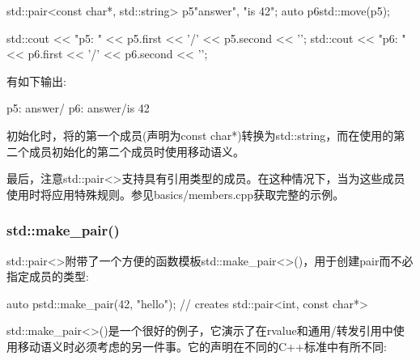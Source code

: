 \begin{cppcode}
std::pair<const char*, std::string> p5{"answer", "is 42"};
auto p6{std::move(p5)};

std::cout << "p5: " << p5.first << '/' << p5.second << '\n';
std::cout << "p6: " << p6.first << '/' << p6.second << '\n';
\end{cppcode}

有如下输出:

\begin{outputcode}
p5: answer/
p6: answer/is 42
\end{outputcode}

初始化时，将的第一个成员(声明为const char*)转换为std::string，而在使用的第二个成员初始化的第二个成员时使用移动语义。

最后，注意std::pair<>支持具有引用类型的成员。在这种情况下，当为这些成员使用时将应用特殊规则。参见basics/members.cpp获取完整的示例。

\subsubsection{std::make_pair()}

std::pair<>附带了一个方便的函数模板std::make_pair<>()，用于创建pair而不必指定成员的类型:

\begin{cppcode}
auto p{std::make_pair(42, "hello")}; // creates std::pair<int, const char*>
\end{cppcode}

std::make_pair<>()是一个很好的例子，它演示了在rvalue和通用/转发引用中使用移动语义时必须考虑的另一件事。它的声明在不同的C++标准中有所不同:

